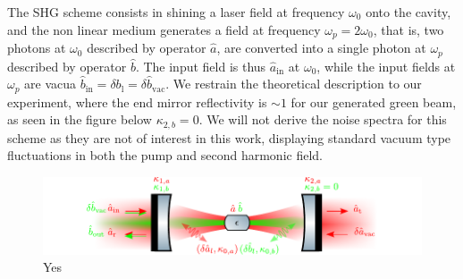 The SHG scheme consists in shining a laser field at frequency $\omega_0$ onto the cavity, and the non linear medium generates a field at frequency $\omega_p = 2\omega_0$, that is, two photons at $\omega_0$ described by operator $\hat{a}$, are converted into a single photon at $\omega_p$ described by operator $\hat{b}$. The input field is thus $\hat{a}_{\mathrm{in}}$ at $\omega_0$, while the input fields at $\omega_p$ are vacua $\hat{b}_{\mathrm{in}} = \delta {b}_{\mathrm{l}}= \delta \hat{b}_{\mathrm{vac}}$. We restrain the theoretical description to our experiment, where the end mirror reflectivity is $\sim 1$ for our generated green beam, as seen in the figure below $\kappa_{2,b}=0$. We will not derive the noise spectra for this scheme as they are not of interest in this work, displaying standard vacuum type fluctuations in both the pump and second harmonic field.
\begin{figure}[h]
\centering
\includegraphics[width=\textwidth]{./chap2/fig/cavitySHG copy.pdf}
\caption{Yes} 
\end{figure}

